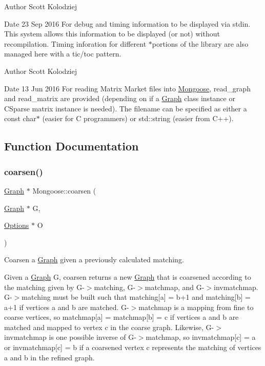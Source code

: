 \begin{DoxyAuthor}{Author}
Scott Kolodziej 
\end{DoxyAuthor}
\begin{DoxyDate}{Date}
23 Sep 2016 For debug and timing information to be displayed via stdin. This system allows this information to be displayed (or not) without recompilation. Timing inforation for different $\ast$portions of the library are also managed here with a tic/toc pattern.
\end{DoxyDate}
\begin{DoxyAuthor}{Author}
Scott Kolodziej 
\end{DoxyAuthor}
\begin{DoxyDate}{Date}
13 Jun 2016 For reading Matrix Market files into \hyperlink{namespace_mongoose}{Mongoose}, read\+\_\+graph and read\+\_\+matrix are provided (depending on if a \hyperlink{class_mongoose_1_1_graph}{Graph} class instance or C\+Sparse matrix instance is needed). The filename can be specified as either a const char$\ast$ (easier for C programmers) or std\+::string (easier from C++). 
\end{DoxyDate}


\subsection{Function Documentation}
\hypertarget{namespace_mongoose_a449a68ce1571bc656fe05abd1fc6bbc8}{}\label{namespace_mongoose_a449a68ce1571bc656fe05abd1fc6bbc8} 
\subsubsection{\texorpdfstring{coarsen()}{coarsen()}}
{\footnotesize\ttfamily \hyperlink{class_mongoose_1_1_graph}{Graph} $\ast$ Mongoose\+::coarsen (\begin{DoxyParamCaption}\item[{\hyperlink{class_mongoose_1_1_graph}{Graph} $\ast$}]{G,  }\item[{\hyperlink{struct_mongoose_1_1_options}{Options} $\ast$}]{O }\end{DoxyParamCaption})}



Coarsen a \hyperlink{class_mongoose_1_1_graph}{Graph} given a previously calculated matching. 

Given a \hyperlink{class_mongoose_1_1_graph}{Graph} {\ttfamily G}, coarsen returns a new \hyperlink{class_mongoose_1_1_graph}{Graph} that is coarsened according to the matching given by G-\/$>$matching, G-\/$>$matchmap, and G-\/$>$invmatchmap. G-\/$>$matching must be built such that matching\mbox{[}a\mbox{]} = b+1 and matching\mbox{[}b\mbox{]} = a+1 if vertices a and b are matched. G-\/$>$matchmap is a mapping from fine to coarse vertices, so matchmap\mbox{[}a\mbox{]} = matchmap\mbox{[}b\mbox{]} = c if vertices a and b are matched and mapped to vertex c in the coarse graph. Likewise, G-\/$>$invmatchmap is one possible inverse of G-\/$>$matchmap, so invmatchmap\mbox{[}c\mbox{]} = a or invmatchmap\mbox{[}c\mbox{]} = b if a coarsened vertex c represents the matching of vertices a and b in the refined graph.



